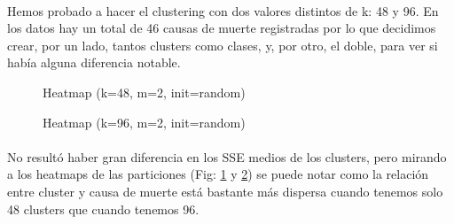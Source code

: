 \documentclass[10pt,a4paper]{article}
\begin{document}
	\paragraph{}
	Hemos probado a hacer el clustering con dos valores distintos de k: 48 y 96. En los datos hay un total de 46 causas de muerte registradas por lo que decidimos crear, por un lado, tantos clusters como clases, y, por otro, el doble, para ver si había alguna diferencia notable.
	\begin{figure}
		\centering
		\caption{Heatmap (k=48, m=2, init=random)}
		\label{fig:htm_48_2_random}
	\end{figure}
	\begin{figure}
		\centering
		\caption{Heatmap (k=96, m=2, init=random)}
		\label{fig:htm_96_2_random}
	\end{figure}
	
	\paragraph{}
	No resultó haber gran diferencia en los SSE medios de los clusters, pero mirando a los heatmaps de las particiones (Fig: \ref{fig:htm_48_2_random} y \ref{fig:htm_96_2_random}) se puede notar como la relación entre cluster y causa de muerte está bastante más dispersa cuando tenemos solo 48 clusters que cuando tenemos 96.
	
\end{document}
